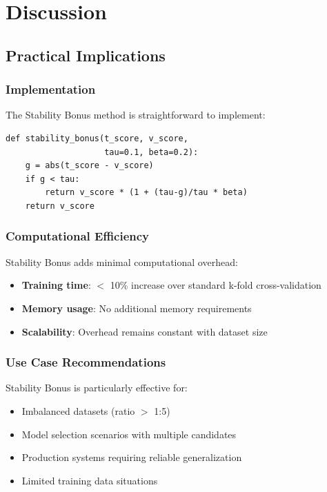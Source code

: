 \documentclass[11pt,twocolumn]{article}
\begin{document}
\section{Discussion}

\subsection{Practical Implications}

\subsubsection{Implementation}
The Stability Bonus method is straightforward to implement:

{\footnotesize
\begin{verbatim}
def stability_bonus(t_score, v_score, 
                    tau=0.1, beta=0.2):
    g = abs(t_score - v_score)
    if g < tau:
        return v_score * (1 + (tau-g)/tau * beta)
    return v_score
\end{verbatim}
}

\subsubsection{Computational Efficiency}
Stability Bonus adds minimal computational overhead:
\begin{itemize}
    \item \textbf{Training time}: $<$ 10\% increase over standard k-fold cross-validation
    \item \textbf{Memory usage}: No additional memory requirements
    \item \textbf{Scalability}: Overhead remains constant with dataset size
\end{itemize}

\subsubsection{Use Case Recommendations}
Stability Bonus is particularly effective for:
\begin{itemize}
    \item Imbalanced datasets (ratio $>$ 1:5)
    \item Model selection scenarios with multiple candidates
    \item Production systems requiring reliable generalization
    \item Limited training data situations
\end{itemize}
\end{document}
